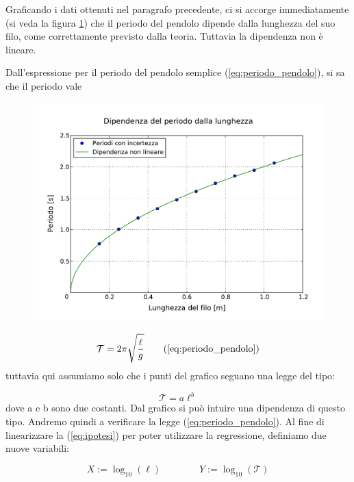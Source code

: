 Graficando i dati ottenuti nel paragrafo precedente, ci si accorge immediatamente (si veda
la figura \ref{fig:lunghezza_periodo}) che il periodo del pendolo dipende dalla lunghezza
del suo filo, come correttamente previsto dalla teoria. Tuttavia la dipendenza non è lineare.

Dall'espressione per il periodo del pendolo semplice (\ref{eq:periodo_pendolo}), si sa che
il periodo vale

\begin{figure}
    \centering
    \includegraphics[width=120mm]{immagini/lunghezza_periodo.pdf}
    \caption{}
    \label{fig:lunghezza_periodo}
\end{figure}

\begin{equation}
    \mathcal{T} = 2\pi\sqrt{\frac{\ell}{g}}
    \tag{\ref{eq:periodo_pendolo}}
\end{equation}
%
tuttavia qui assumiamo solo che i punti del grafico seguano una legge del tipo:

\begin{equation}
    \mathcal{T} = a\ell^b
    \label{eq:ipotesi}
\end{equation}
%
dove a e b sono due costanti. Dal grafico si può intuire una dipendenza di questo tipo.
Andremo quindi a verificare la legge (\ref{eq:periodo_pendolo}).
Al fine di linearizzare la (\ref{eq:ipotesi}) per poter utilizzare la regressione, definiamo due nuove variabili:

\begin{equation}
    X := \log_{10}{(\ell)} \qquad \qquad Y := \log_{10}{(\mathcal{T})}
\end{equation}


